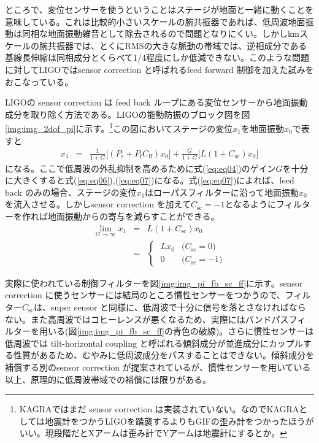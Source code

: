 \documentclass[a4paper,12pt]{jsarticle}
\begin{document}
ところで、変位センサーを使うということはステージが地面と一緒に動くことを意味している。これは比較的小さいスケールの腕共振器であれば、低周波地面振動は同相な地面振動雑音として除去されるので問題となりにくい。しかしkmスケールの腕共振器では、とくにRMSの大きな脈動の帯域では、逆相成分である基線長伸縮は同相成分とくらべて1/4程度にしか低減できない\cite{miyo2018cdmr}。このような問題に対してLIGOではsensor correction と呼ばれるfeed forward 制御を加えた試みをおこなっている\cite{hua2005low}\cite{matichard2015seismic}。


LIGOの sensor correction は feed back ループにある変位センサーから地面振動成分を取り除く方法である。LIGOの能動防振のブロック図を図\ref{img:img_2dof_pi}に示す。\footnote{KAGRAではまだ sensor correction は実装されていない。なのでKAGRAとしては地震計をつかうLIGOを踏襲するよりもGIFの歪み計をつかったほうがいい。現段階だとXアームは歪み計でYアームは地震計にするとか。}この図においてステージの変位$x_1$を地面振動$x_0$で表すと
\begin{eqnarray} \label{eq:eq04}
  x_1 &=& \frac{1}{1+G}\Biggl[(P_{\mathrm{s}}+P_{\mathrm{f}}C_{\mathrm{ff}})x_0\Biggl]
  + \frac{G}{1+G}\Biggl[L(1+C_{\mathrm{sc}})x_0\Biggl]
\end{eqnarray}
になる。ここで低周波の外乱抑制を高めるために式(\ref{eq:eq04})のゲイン$G$を十分に大きくすると式(\ref{eq:eq06}),(\ref{eq:eq07})になる。式(\ref{eq:eq07})によれば、feed back のみの場合、ステージの変位$x_1$はローパスフィルターに沿って地面振動$x_0$を流入させる。しかしsensor correction を加えて$C_{\mathrm{sc}}=-1$となるようにフィルターを作れば地面振動からの寄与を減らすことができる。
\begin{eqnarray}\label{eq:eq06}
  \lim_{G \to \infty} x_{1} &=& L(1+C_{\mathrm{sc}})x_0 \\
  &=&
  \begin{cases}\label{eq:eq07}
    \; Lx_{0} & \text{($C_{\mathrm{sc}}=0$)}\\
    \; 0 & \text{($C_{\mathrm{sc}}=-1$)} 
  \end{cases}  
\end{eqnarray}

実際に使われている制御フィルターを図\ref{img:img_pi_fb_sc_ff}に示す。sensor correction に使うセンサーには結局のところ慣性センサーをつかうので、フィルター$C_{\mathrm{sc}}$は、super sensor と同様に、低周波で十分に信号を落とさなければならない。また高周波ではコヒーレンスが悪くなるため、実際にはバンドパスフィルターを用いる(図\ref{img:img_pi_fb_sc_ff}の青色の破線)。さらに慣性センサーは低周波では tilt-horizontal coupling と呼ばれる傾斜成分が並進成分にカップルする性質があるため、むやみに低周波成分をパスすることはできない。傾斜成分を補償する別のsensor correction が提案されているが\cite{biscansD2018}、慣性センサーを用いている以上、原理的に低周波帯域での補償には限りがある。
\end{document}

